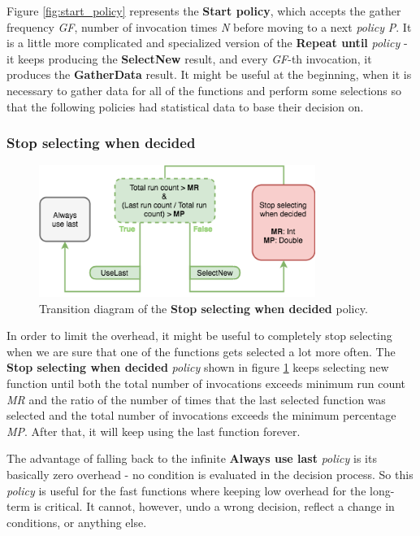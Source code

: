 Figure \ref{fig:start_policy} represents the \textbf{Start policy}, which accepts the gather frequency \textit{GF}, number of invocation times \textit{N} before moving to a next \textit{policy} \textit{P}. It is a little more complicated and specialized version of the \textbf{Repeat until} \textit{policy} - it keeps producing the \textbf{SelectNew} result, and every \textit{GF}-th invocation, it produces the \textbf{GatherData} result. It might be useful at the beginning, when it is necessary to gather data for all of the functions and perform some selections so that the following policies had statistical data to base their decision on.

\subsubsection{Stop selecting when decided}

\begin{figure}[h!]
	\captionsetup{justification=centering,margin=0.5cm}
	\centerline{\mbox{\includegraphics[width=90mm]{./img/stop_selecting_when_decided.png}}}
	\caption{Transition diagram of the \textbf{Stop selecting  when decided} policy.}
	\label{fig:stop_selecting_when_decided}
\end{figure}

In order to limit the overhead, it might be useful to completely stop selecting when we are sure that one of the functions gets selected a lot more often. The \textbf{Stop selecting when decided} \textit{policy} shown in figure \ref{fig:stop_selecting_when_decided} keeps selecting new function until both the total number of invocations exceeds minimum run count \textit{MR} and the ratio of the number of times that the last selected function was selected and the total number of invocations exceeds the minimum percentage \textit{MP}. After that, it will keep using the last function forever. 

The advantage of falling back to the infinite \textbf{Always use last} \textit{policy} is its basically zero overhead - no condition is evaluated in the decision process. So this \textit{policy} is useful for the fast functions where keeping low overhead for the long-term is critical. It cannot, however, undo a wrong decision, reflect a change in conditions, or anything else.


